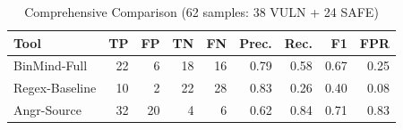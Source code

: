 \begin{table}[htbp]
\centering
\caption{Comprehensive Comparison (62 samples: 38 VULN + 24 SAFE)}
\label{tab:comprehensive-comparison}
\begin{tabular}{lrrrrrrrr}
\toprule
Tool & TP & FP & TN & FN & Prec. & Rec. & F1 & FPR \\
\midrule
BinMind-Full & 22 & 6 & 18 & 16 & 0.79 & 0.58 & 0.67 & 0.25 \\
Regex-Baseline & 10 & 2 & 22 & 28 & 0.83 & 0.26 & 0.40 & 0.08 \\
Angr-Source & 32 & 20 & 4 & 6 & 0.62 & 0.84 & 0.71 & 0.83 \\
\bottomrule
\end{tabular}
\end{table}
